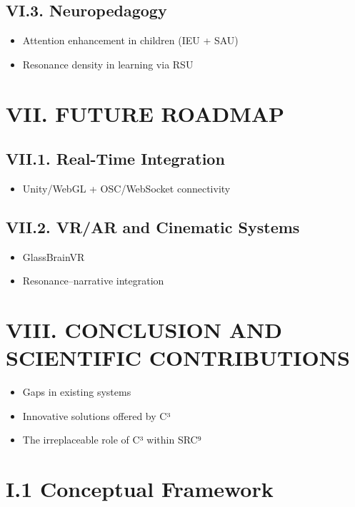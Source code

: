 \subsection*{VI.3. Neuropedagogy}

\begin{itemize}
    \item Attention enhancement in children (IEU + SAU)
    \item Resonance density in learning via RSU
\end{itemize}

\section*{VII. FUTURE ROADMAP}

\subsection*{VII.1. Real-Time Integration}

\begin{itemize}
    \item Unity/WebGL + OSC/WebSocket connectivity
\end{itemize}

\subsection*{VII.2. VR/AR and Cinematic Systems}

\begin{itemize}
    \item GlassBrainVR
    \item Resonance–narrative integration
\end{itemize}

\section*{VIII. CONCLUSION AND SCIENTIFIC CONTRIBUTIONS}

\begin{itemize}
    \item Gaps in existing systems
    \item Innovative solutions offered by C³
    \item The irreplaceable role of C³ within SRC⁹
\end{itemize}

\section*{I.1 Conceptual Framework}

